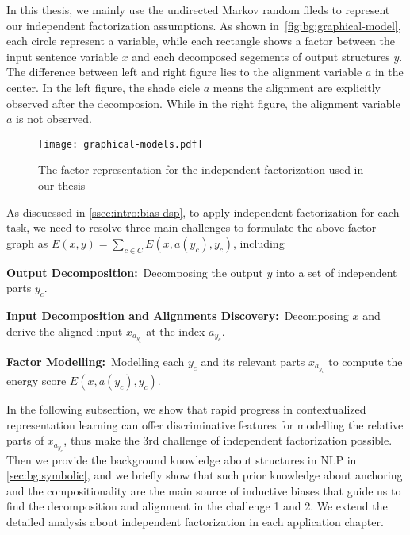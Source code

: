  In this thesis, we mainly use
the undirected Markov random fileds to represent our independent
factorization assumptions. As shown
in~\autoref{fig:bg:graphical-model}, each circle represent a variable,
while each rectangle shows a factor between the input sentence
variable $x$ and each decomposed segements of output structures
$y$. The difference between left and right figure lies to the
alignment variable $a$ in the center. In the left figure, the shade
cicle $a$ means the alignment are explicitly observed after the
decomposion. While in the right figure, the alignment variable $a$ is
not observed.

\begin{figure}[!th]
\centering
\texttt{[image: graphical-models.pdf]}
\caption{\label{fig:bg:graphical-model}The factor representation for
  the independent factorization used in our thesis}
\end{figure}

As discuessed in \autoref{ssec:intro:bias-dsp}, to apply independent
factorization for each task, we need to resolve three main challenges
to formulate the above factor graph as
$E(x, y) = \sum_{c \in C}E(x, a(y_{c}), y_{c})$, including
\begin{inparaenum}[(1)]
\item \textbf{Output Decomposition:}~Decomposing the output $y$ into a set of independent parts
  $y_{c}$.
\item \textbf{Input Decomposition and Alignments Discovery:}~Decomposing $x$ and derive the aligned input $x_{a_{y_{c}}}$ at
  the index $a_{y_{c}}$.
\item \textbf{Factor Modelling:}~Modelling each $y_{c}$ and its
  relevant parts $x_{a_{y_{c}}}$ to compute the energy score
  $E(x, a(y_{c}), y_{c})$.
\end{inparaenum}

In the following subsection, we show that rapid progress in
contextualized representation learning can offer discriminative
features for modelling the relative parts of $x_{a_{y_{c}}}$, thus
make the 3rd challenge of independent factorization possible. Then we
provide the background knowledge about structures in NLP in
\autoref{sec:bg:symbolic}, and we briefly show that such prior
knowledge about anchoring and the compositionality are the main source
of inductive biases that guide us to find the decomposition and
alignment in the challenge 1 and 2.  We extend the detailed analysis
about independent factorization in each application chapter.

